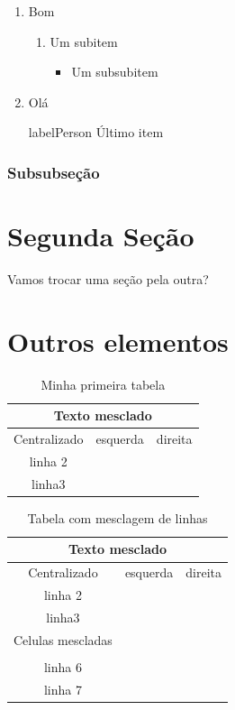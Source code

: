 \documentclass[10pt,a4paper,twocolumn]{book}
\begin{document}
			\begin{enumerate}
				\item Bom
				\begin{enumerate}
					\item Um subitem
					\begin{itemize}
						\item Um subsubitem
					\end{itemize}
				\end{enumerate}
				\item Olá
				\item[labelPerson] Último item 
			\end{enumerate}
			
			\subsubsection{Subsubseção}
 	\section{Segunda Seção}
		Vamos trocar uma seção pela outra?
	
	\section{Outros elementos}
   		\begin{table}[h]
			\caption{Minha primeira tabela}
			\centering
			\begin{tabular}{ c | l | r } \hline
				\multicolumn{3}{c}{Texto mesclado} \\ \hline
				Centralizado &esquerda &direita \\ \hline
				linha 2 & & \\ 
				linha3 & & \\ \hline
			\end{tabular}
		\end{table}
		
		\begin{table}[h]
			\caption{Tabela com mesclagem de linhas}
			\centering
			\begin{tabular}{ c | l | r } \hline
				\multicolumn{3}{c}{Texto mesclado} \\ \hline
				Centralizado &esquerda &direita \\ \hline
				linha 2 & & \\ 
				linha3 & & \\ \hline
				\multirow{2}{*}{Celulas mescladas} & & \\ \hline
				& & \\
				& & \\ \hline
				linha 6 & &\\ \cline{2-3}
				linha 7 & &\\ \hline
			\end{tabular}
		\end{table}
		
\end{document}
